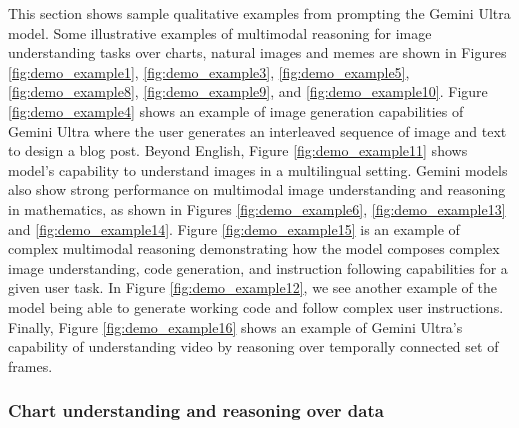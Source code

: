 \noindent This section shows sample qualitative examples from prompting the Gemini Ultra model. 
Some illustrative examples of multimodal reasoning for image understanding tasks over charts, natural images and memes are shown in Figures \ref{fig:demo_example1}, \ref{fig:demo_example3}, \ref{fig:demo_example5}, \ref{fig:demo_example8}, \ref{fig:demo_example9}, and \ref{fig:demo_example10}. Figure \ref{fig:demo_example4} shows an example of image generation capabilities of Gemini Ultra where the user generates an interleaved sequence of image and text to design a blog post. Beyond English, Figure \ref{fig:demo_example11} shows model's capability to understand images in a multilingual setting. Gemini models also show strong performance on multimodal image understanding and reasoning in mathematics, as shown in Figures \ref{fig:demo_example6}, \ref{fig:demo_example13} and \ref{fig:demo_example14}. Figure \ref{fig:demo_example15} is an example of complex multimodal reasoning demonstrating how the model composes complex image understanding, code generation, and instruction following capabilities for a given user task. In Figure \ref{fig:demo_example12}, we see another example of the model being able to generate working code and follow complex user instructions. Finally, Figure \ref{fig:demo_example16} shows an example of Gemini Ultra's capability of understanding video by reasoning over temporally connected set of frames.

\pagebreak

\newcommand*{\fakebreak}{\par\vspace{\textheight minus \textheight}\pagebreak}

\lstset{language=Rust, style=boxed}
\subsubsection{Chart understanding and reasoning over data}
\vspace{-5mm}

